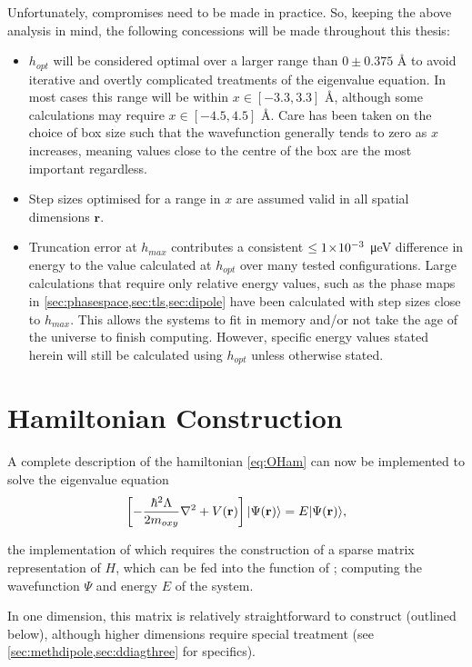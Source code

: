 Unfortunately, compromises need to be made in practice. So, keeping the above analysis in mind, the following concessions will be made throughout this thesis:
\begin{itemize}
  \item $h_{opt}$ will be considered optimal over a larger range than $0\pm0.375$ Å to avoid iterative and overtly complicated treatments of the eigenvalue equation.
      In most cases this range will be within $x \in [-3.3, 3.3]$ Å, although some calculations may require $x \in [-4.5, 4.5]$ Å.
      Care has been taken on the choice of box size such that the wavefunction generally tends to zero as $x$ increases, meaning values close to the centre of the box are the most important regardless.
  \item Step sizes optimised for a range in $x$ are assumed valid in all spatial dimensions $\mathbf{r}$.
  \item Truncation error at $h_{max}$ contributes a consistent $\leq1\!\times\!10^{-3}$ μeV difference in energy to the value calculated at $h_{opt}$ over many tested configurations.
      Large calculations that require only relative energy values, such as the phase maps in \cref{sec:phasespace,sec:tls,sec:dipole} have been calculated with step sizes close to $h_{max}$.
      This allows the systems to fit in memory and/or not take the age of the universe to finish computing.
      However, specific energy values stated herein will still be calculated using $h_{opt}$ unless otherwise stated.
\end{itemize}


\section{Hamiltonian Construction}\label{sec:hammat}

A complete description of the hamiltonian \cref{eq:OHam} can now be implemented to solve the eigenvalue equation
\begin{equation}
\left[-\frac{\hbar^2\Lambda}{2m_{oxy}}\nabla^2+V(\mathbf{r})\right]\lvert\Psi(\mathbf{r})\rangle = E\lvert\Psi(\mathbf{r})\rangle,\label{eq:tisemat}
\end{equation}

the implementation of which requires the construction of a sparse matrix representation of $H$, which can be fed into the  function of ; computing the wavefunction $\Psi$ and energy $E$ of the system.

In one dimension, this matrix is relatively straightforward to construct (outlined below), although higher dimensions require special treatment (see \cref{sec:methdipole,sec:ddiagthree} for specifics).

